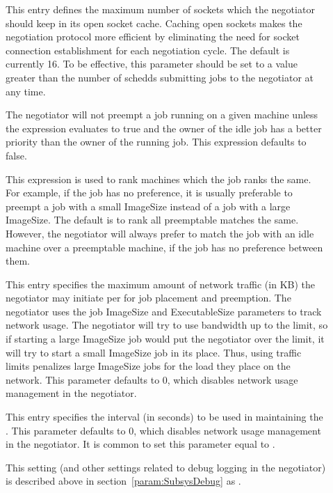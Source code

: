 \begin{description}
\item[]
  \label{param:NegotiatorSocketCacheSize} This entry defines the
  maximum number of sockets which the negotiator should keep in its
  open socket cache.  Caching open sockets makes the negotiation
  protocol more efficient by eliminating the need for socket
  connection establishment for each negotiation cycle.  The default is
  currently 16.  To be effective, this parameter should be set to a
  value greater than the number of schedds submitting jobs to the
  negotiator at any time.

\item[]
  \label{param:PreemptionRequirements} The negotiator will not preempt
  a job running on a given machine unless the
   expression evaluates to true and the
  owner of the idle job has a better priority than the owner of the
  running job.  This expression defaults to false.

\item[] \label{param:PreemptionRank} This
  expression is used to rank machines which the job ranks the same.
  For example, if the job has no preference, it is usually preferable
  to preempt a job with a small ImageSize instead of a job with a
  large ImageSize.  The default is to rank all preemptable matches the
  same.  However, the negotiator will always prefer to match the job
  with an idle machine over a preemptable machine, if the job has no
  preference between them.

\item[]
  \label{param:NegotiatorTrafficLimit} This entry specifies the
  maximum amount of network traffic (in KB) the negotiator may
  initiate per  for job placement
  and preemption.  The negotiator uses the job ImageSize and
  ExecutableSize parameters to track network usage.  The negotiator
  will try to use bandwidth up to the limit, so if starting a large
  ImageSize job would put the negotiator over the limit, it will try
  to start a small ImageSize job in its place.  Thus, using traffic
  limits penalizes large ImageSize jobs for the load they place on the
  network.  This parameter defaults to 0, which disables network usage
  management in the negotiator.

\item[]
  \label{param:NegotiatorTrafficInterval} This entry specifies the
  interval (in seconds) to be used in maintaining the
  .  This parameter defaults to 0,
  which disables network usage management in the negotiator.  It is
  common to set this parameter equal to .
  
\item[] \label{param:NegotiatorDebug} This setting
  (and other settings related to debug logging in the negotiator) is
  described above in section~\ref{param:SubsysDebug} as
  .

\end{description}

